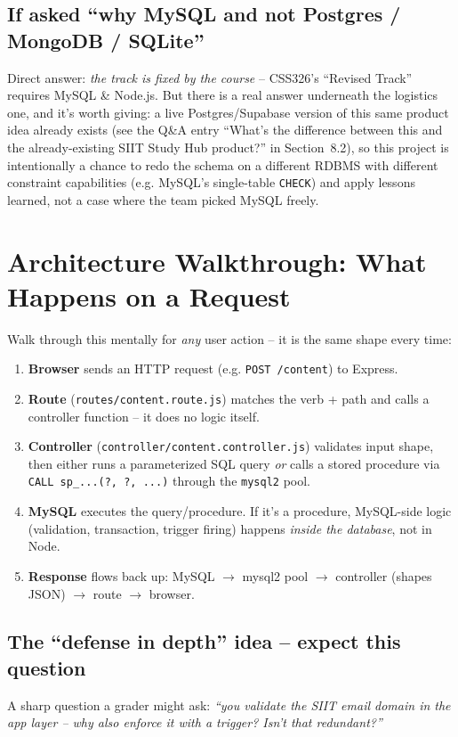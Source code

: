 \documentclass[11pt]{article}
\begin{document}
\subsection{If asked ``why MySQL and not Postgres / MongoDB / SQLite''}
Direct answer: \emph{the track is fixed by the course} -- CSS326's ``Revised Track'' requires MySQL \& Node.js. But there is a real answer underneath the logistics one, and it's worth giving: a live Postgres/Supabase version of this same product idea already exists (see the Q\&A entry ``What's the difference between this and the already-existing SIIT Study Hub product?'' in Section~8.2), so this project is intentionally a chance to redo the schema on a different RDBMS with different constraint capabilities (e.g. MySQL's single-table \texttt{CHECK}) and apply lessons learned, not a case where the team picked MySQL freely.

\section{Architecture Walkthrough: What Happens on a Request}

Walk through this mentally for \emph{any} user action -- it is the same shape every time:

\begin{enumerate}[leftmargin=1.6em]
  \item \textbf{Browser} sends an HTTP request (e.g. \texttt{POST /content}) to Express.
  \item \textbf{Route} (\texttt{routes/content.route.js}) matches the verb + path and calls a controller function -- it does no logic itself.
  \item \textbf{Controller} (\texttt{controller/content.controller.js}) validates input shape, then either runs a parameterized SQL query \emph{or} calls a stored procedure via \texttt{CALL sp\_...(?, ?, ...)} through the \texttt{mysql2} pool.
  \item \textbf{MySQL} executes the query/procedure. If it's a procedure, MySQL-side logic (validation, transaction, trigger firing) happens \emph{inside the database}, not in Node.
  \item \textbf{Response} flows back up: MySQL $\rightarrow$ mysql2 pool $\rightarrow$ controller (shapes JSON) $\rightarrow$ route $\rightarrow$ browser.
\end{enumerate}

\subsection{The ``defense in depth'' idea -- expect this question}
A sharp question a grader might ask: \emph{``you validate the SIIT email domain in the app layer -- why also enforce it with a trigger? Isn't that redundant?''}
\end{document}

